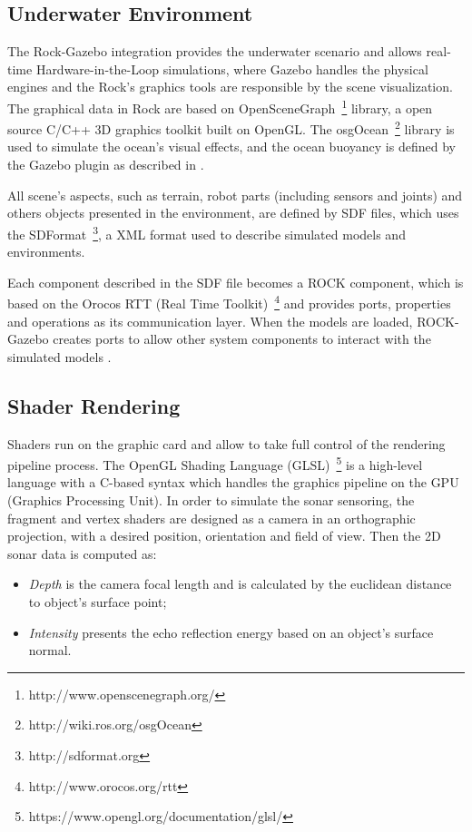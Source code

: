 \documentclass[final,5p,times]{elsarticle}
\begin{document}
\subsection{Underwater Environment}
\label{dev:uwscene}

The Rock-Gazebo integration \cite{watanabe2015} provides the underwater scenario and allows real-time Hardware-in-the-Loop simulations, where Gazebo handles the physical engines and the Rock's graphics tools are responsible by the scene visualization. The graphical data in Rock are based on OpenSceneGraph~\footnote{http://www.openscenegraph.org/} library, a open source C/C++ 3D graphics toolkit built on OpenGL. The osgOcean~\footnote{http://wiki.ros.org/osgOcean} library is used to simulate the ocean's visual effects, and the ocean buoyancy is defined by the Gazebo plugin as described in \cite{watanabe2015}.

All scene's aspects, such as terrain, robot parts (including sensors and joints) and others objects presented in the environment, are defined by SDF files, which uses the SDFormat~\footnote{http://sdformat.org}, a XML format used to describe simulated models and environments.

Each component described in the SDF file becomes a ROCK component, which is based on the Orocos RTT (Real Time Toolkit)~\footnote{http://www.orocos.org/rtt} and provides ports, properties and operations as its communication layer. When the models are loaded, ROCK-Gazebo creates ports to allow other system components to interact with the simulated models \cite{cerqueira2016}.

\subsection{Shader Rendering}
\label{dev:shader}

Shaders run on the graphic card and allow to take full control of the rendering pipeline process. The OpenGL Shading Language (GLSL)~\footnote{https://www.opengl.org/documentation/glsl/} is a high-level language with a C-based syntax which handles the graphics pipeline on the GPU (Graphics Processing Unit). In order to simulate the sonar sensoring, the fragment and vertex shaders are designed as a camera in an orthographic projection, with a desired position, orientation and field of view. Then the 2D sonar data is computed as:

\begin{itemize}
    \item \textit{Depth} is the camera focal length and is calculated by the euclidean distance to object's surface point;
    \item \textit{Intensity} presents the echo reflection energy based on an object's surface normal.
\end{itemize}
\end{document}
